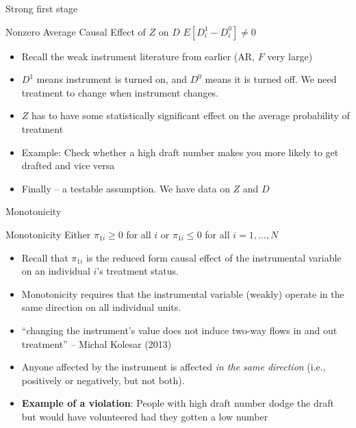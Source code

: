 \documentclass{beamer}
\begin{document}
\begin{frame}{Strong first stage}

  \begin{block}{Nonzero Average Causal Effect of $Z$ on $D$}
    $E[D^1_{i} - D^0_{i}]\neq{0}$
  \end{block}

  \begin{itemize}
    \item Recall the weak instrument literature from earlier (AR, $F$ very large)
    \item $D^1$ means instrument is turned on, and $D^0$ means it is turned off. We need treatment to change when instrument changes.
    \item $Z$ has to have some statistically significant effect on the average probability of treatment
    \item Example: Check whether a high draft number makes you more likely to get drafted and vice versa
    \item Finally -- a testable assumption. We have data on $Z$ and $D$
  \end{itemize}

\end{frame}


\begin{frame}{Monotonicity}

  \begin{block}{Monotonicity}
    Either $\pi_{1i}\geq{0}$ for all $i$ or $\pi_{1i}\leq{0}$ for all $i=1, \dots, N$
  \end{block}

  \begin{itemize}

    \item Recall that $\pi_{1i}$ is the reduced form causal effect of the instrumental variable on an individual $i$'s treatment status.
    \item Monotonicity requires that the instrumental variable (weakly) operate in the same direction on all individual units.
    \item ``changing the instrument's value does not induce two-way flows in and out treatment'' -- Michal Kolesar (2013)
    \item Anyone affected by the instrument is affected \emph{in the same direction} (i.e., positively or negatively, but not both).
    \item \textbf{Example of a violation}: People with high draft number dodge the draft but would have volunteered had they gotten a low number

  \end{itemize}

\end{frame}
\end{document}
